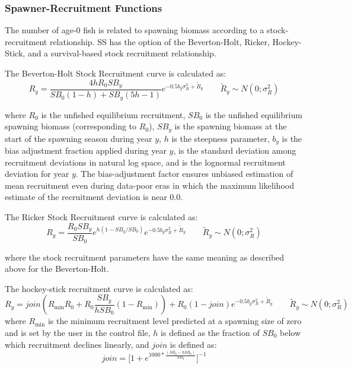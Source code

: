 \subsubsection{Spawner-Recruitment Functions}
The number of age-0 fish is related to spawning biomass according to a stock-recruitment relationship.  SS has the option of the Beverton-Holt, Ricker, Hockey-Stick, and a survival-based stock recruitment relationship.

\hypertarget{BH}{}
The Beverton-Holt Stock Recruitment curve is calculated as:
\begin{equation}{R_y = \frac{4hR_0SB_y}{SB_0(1-h)+SB_y(5h-1)}e^{-0.5b_y\sigma^2_R+\tilde{R}_y}\qquad  \tilde{R}_y\sim N(0;\sigma^2_R)}
\end{equation}

where $R_0$ is the unfished equilibrium recruitment, $SB_0$ is the unfished equilibrium spawning biomass (corresponding to $R_0$), $SB_y$ is the spawning biomass at the start of the spawning season during year $y$, $h$ is the steepness parameter, $b_y$ is the bias adjustment fraction applied during year $y$, is the standard deviation among recruitment deviations in natural log space, and is the lognormal recruitment deviation for year $y$. The bias-adjustment factor \citep{methot-adjusting-2011} ensures unbiased estimation of mean recruitment even during data-poor eras in which the maximum likelihood estimate of the recruitment deviation is near 0.0.

\hypertarget{Ricker}{}
The Ricker Stock Recruitment curve is calculated as:
\begin{equation}{R_y = \frac{R_0SB_y}{SB_0}e^{h(1-SB_y/SB_0)}e^{-0.5b_y\sigma^2_R+\tilde{R}_y}\qquad  \tilde{R}_y\sim N(0;\sigma^2_R)}
\end{equation}

where the stock recruitment parameters have the same meaning as described above for the Beverton-Holt.

\hypertarget{Hockey}{}
The hockey-stick recruitment curve is calculated as:
\begin{equation}{R_y = join(R_{\text{min}}R_0+R_0\frac{SB_y}{hSB_0}(1-R_{\text{min}}))+R_0(1-join)e^{-0.5b_y\sigma^2_R+\tilde{R}_y}\qquad  \tilde{R}_y\sim N(0;\sigma^2_R)}\end{equation}
where $R_{\text{min}}$ is the minimum recruitment level predicted at a spawning size of zero and is set by the user in the control file, $h$ is defined as the fraction of $SB_0$ below which recruitment declines linearly, and $join$ is defined as:
\begin{equation}{ join = \bigg[1+e^{1000*\frac{(SB_0-hSB_0)}{SB_0}}\bigg]^{-1} } \end{equation}

